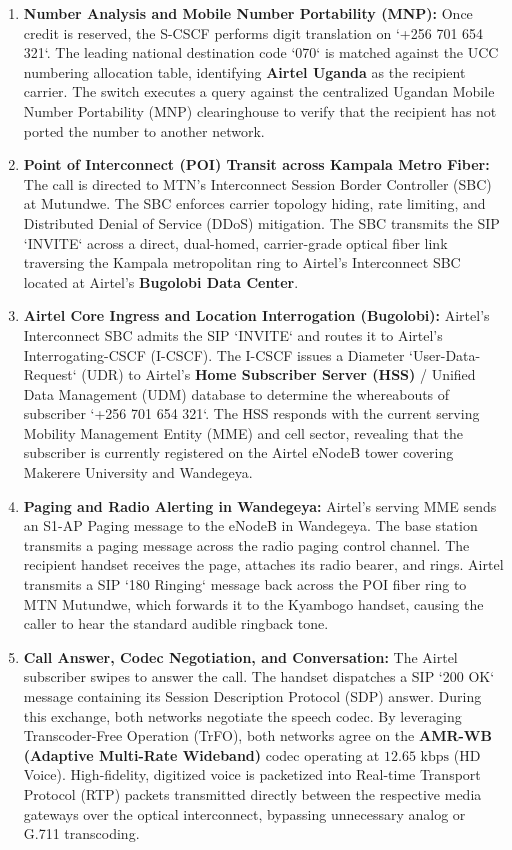 \documentclass[12pt,a4paper]{report}
\begin{document}
\begin{enumerate}
    \item \textbf{Number Analysis and Mobile Number Portability (MNP):}
    Once credit is reserved, the S-CSCF performs digit translation on `+256 701 654 321`. The leading national destination code `070` is matched against the UCC numbering allocation table, identifying \textbf{Airtel Uganda} as the recipient carrier. The switch executes a query against the centralized Ugandan Mobile Number Portability (MNP) clearinghouse to verify that the recipient has not ported the number to another network.

    \item \textbf{Point of Interconnect (POI) Transit across Kampala Metro Fiber:}
    The call is directed to MTN's Interconnect Session Border Controller (SBC) at Mutundwe. The SBC enforces carrier topology hiding, rate limiting, and Distributed Denial of Service (DDoS) mitigation. The SBC transmits the SIP `INVITE` across a direct, dual-homed, carrier-grade optical fiber link traversing the Kampala metropolitan ring to Airtel's Interconnect SBC located at Airtel's \textbf{Bugolobi Data Center}.

    \item \textbf{Airtel Core Ingress and Location Interrogation (Bugolobi):}
    Airtel's Interconnect SBC admits the SIP `INVITE` and routes it to Airtel's Interrogating-CSCF (I-CSCF). The I-CSCF issues a Diameter `User-Data-Request` (UDR) to Airtel's \textbf{Home Subscriber Server (HSS)} / Unified Data Management (UDM) database to determine the whereabouts of subscriber `+256 701 654 321`. The HSS responds with the current serving Mobility Management Entity (MME) and cell sector, revealing that the subscriber is currently registered on the Airtel eNodeB tower covering Makerere University and Wandegeya.

    \item \textbf{Paging and Radio Alerting in Wandegeya:}
    Airtel's serving MME sends an S1-AP Paging message to the eNodeB in Wandegeya. The base station transmits a paging message across the radio paging control channel. The recipient handset receives the page, attaches its radio bearer, and rings. Airtel transmits a SIP `180 Ringing` message back across the POI fiber ring to MTN Mutundwe, which forwards it to the Kyambogo handset, causing the caller to hear the standard audible ringback tone.

    \item \textbf{Call Answer, Codec Negotiation, and Conversation:}
    The Airtel subscriber swipes to answer the call. The handset dispatches a SIP `200 OK` message containing its Session Description Protocol (SDP) answer. During this exchange, both networks negotiate the speech codec. By leveraging Transcoder-Free Operation (TrFO), both networks agree on the \textbf{AMR-WB (Adaptive Multi-Rate Wideband)} codec operating at $12.65\text{ kbps}$ (HD Voice). High-fidelity, digitized voice is packetized into Real-time Transport Protocol (RTP) packets transmitted directly between the respective media gateways over the optical interconnect, bypassing unnecessary analog or G.711 transcoding.


\end{enumerate}
\end{document}
